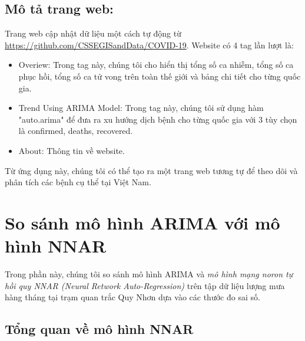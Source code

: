 \documentclass[12pt, a4paper,oneside]{book}
\theoremstyle{definition}
\begin{document}
\subsection*{Mô tả trang web:}
Trang web cập nhật dữ liệu một cách tự động từ \url{https://github.com/CSSEGISandData/COVID-19}. Website có 4 tag lần lượt là:
\begin{itemize}
	\item Overiew: Trong tag này, chúng tôi cho hiển thị tổng số ca nhiễm, tổng số ca phục hồi, tổng số ca tử vong trên toàn thế giới và bảng chi tiết cho từng quốc gia.
	\item Trend Using ARIMA Model: Trong tag này, chúng tôi sử dụng hàm "auto.arima" để đưa ra xu hướng dịch bệnh cho từng quốc gia với 3 tùy chọn là confirmed, deaths, recovered.
	\item About: Thông tin về website.
\end{itemize}
Từ ứng dụng này, chúng tôi có thể tạo ra một trang web tương tự để theo dõi và phân tích các bệnh cụ thể tại Việt Nam.

\section{So sánh mô hình ARIMA với mô hình NNAR}
Trong phần này, chúng tôi so sánh mô hình ARIMA và \textit{mô hình mạng noron tự hồi quy NNAR (Neural Retwork Auto-Regression)} trên tập dữ liệu lượng mưa hàng tháng tại trạm quan trắc Quy Nhơn dựa vào các thước đo sai số.
\subsection*{Tổng quan về mô hình NNAR}
\end{document}
